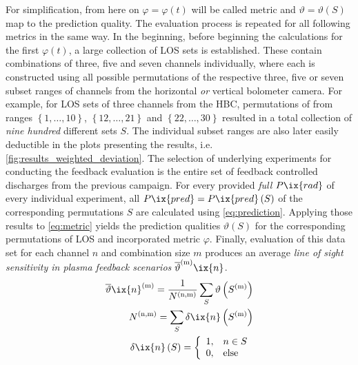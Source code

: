             For simplification, from here on $\varphi=\varphi\left(t\right)$ will be called metric and $\vartheta=\vartheta\left(S\right)$ map to the prediction quality. The evaluation process is repeated for all following metrics in the same way. In the beginning, before beginning the calculations for the first $\varphi\left(t\right)$, a large collection of LOS sets is established. These contain combinations of three, five and seven channels individually, where each is constructed using all possible permutations of the respective three, five or seven subset ranges of channels from the horizontal \textit{or} vertical bolometer camera. For example, for LOS sets of three channels from the HBC, permutations of from ranges $\left\{1, \dots, 10\right\}$, $\left\{12, \dots, 21\right\}$ and $\left\{22, \dots, 30\right\}$ resulted in a total collection of \textit{nine hundred} different sets $S$. The individual subset ranges are also later easily deductible in the plots presenting the results, i.e. \cref{fig:results_weighted_deviation}. The selection of underlying experiments for conducting the feedback evaluation is the entire set of feedback controlled discharges from the previous campaign. For every provided \textit{full} $P\ix{rad}$ of every individual experiment, all $P\ix{pred}=P\ix{pred}\left(S\right)$ of the corresponding permutations $S$ are calculated using \cref{eq:prediction}. Applying those results to \cref{eq:metric} yields the prediction qualities $\vartheta\left(S\right)$ for the corresponding permutations of LOS and incorporated metric $\varphi$. Finally, evaluation of this data set for each channel $n$ and combination size $m$ produces an average \textit{line of sight sensitivity in plasma feedback scenarios} $\overline{\vartheta}^{\left(\text{m}\right)}\ix{n}$.%
%
            \begin{align}%
                \begin{split}\label{eq:sensitivity}%
                    \overline{\vartheta}\ix{n}^{\left(\text{m}\right)}=\frac{1}{N^{\left(\text{n,m}\right)}}\sum_{S}\vartheta\left(S^{\left(\text{m}\right)}\right)\\%
                    N^{\left(\text{n,m}\right)}=\sum_{S}\delta\ix{n}\left(S^{\left(\text{m}\right)}\right)\\%
                    \delta\ix{n}\left(S\right)=\left\{%
                    \begin{array}{ll}%
                        1,&n\in S\\%
                        0,&\text{else}%
                    \end{array}\right.%
                \end{split}%
            \end{align}%
